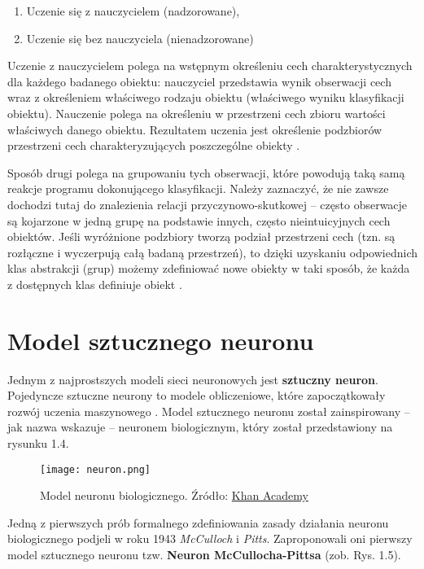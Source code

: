 \begin{enumerate}[leftmargin=2\parindent] %
    \item Uczenie się z nauczycielem (nadzorowane),
    \item Uczenie się bez nauczyciela (nienadzorowane)
\end{enumerate}

Uczenie z nauczycielem polega na wstępnym określeniu cech charakterystycznych dla każdego badanego obiektu: nauczyciel przedstawia wynik obserwacji cech wraz z określeniem właściwego rodzaju obiektu (właściwego wyniku klasyfikacji obiektu). Nauczenie polega na określeniu w przestrzeni cech zbioru wartości właściwych danego obiektu. Rezultatem uczenia jest określenie podzbiorów przestrzeni cech charakteryzujących poszczególne obiekty \citep[s. 8]{Kwiatkowski2007}.

Sposób drugi polega na grupowaniu tych obserwacji, które powodują taką samą reakcje programu dokonującego klasyfikacji. Należy zaznaczyć, że nie zawsze dochodzi tutaj do znalezienia relacji przyczynowo-skutkowej -- często obserwacje są kojarzone w jedną grupę na podstawie innych, często nieintuicyjnych cech obiektów.
Jeśli wyróżnione podzbiory tworzą podział przestrzeni cech (tzn. są rozłączne i wyczerpują całą badaną przestrzeń), to dzięki uzyskaniu odpowiednich klas abstrakcji (grup) możemy zdefiniować nowe obiekty w taki sposób, że każda z dostępnych klas definiuje obiekt \citep[s. 8-9]{Kwiatkowski2007}.

\section{Model sztucznego neuronu}
Jednym z najprostszych modeli sieci neuronowych jest \textbf{sztuczny neuron}. Pojedyncze sztuczne neurony to modele obliczeniowe, które zapoczątkowały rozwój uczenia maszynowego \citep[s. 39]{Raschka_2019}.
Model sztucznego neuronu został zainspirowany -- jak nazwa wskazuje -- neuronem biologicznym, który został przedstawiony na rysunku 1.4.
\begin{figure}[H]
\begin{center}
\texttt{[image: neuron.png]}
\caption{Model neuronu biologicznego. Źródło: \href{https://pl.khanacademy.org/science/biology/human-biology/neuron-nervous-system/a/overview-of-neuron-structure-and-function}{Khan Academy}}
\centering
\end{center}
\end{figure}

Jedną z pierwszych prób formalnego zdefiniowania zasady działania neuronu biologicznego podjeli w roku 1943 \textit{McCulloch} i \textit{Pitts}. Zaproponowali oni pierwszy model sztucznego neuronu tzw. \textbf{Neuron McCullocha-Pittsa} (zob. Rys. 1.5).

